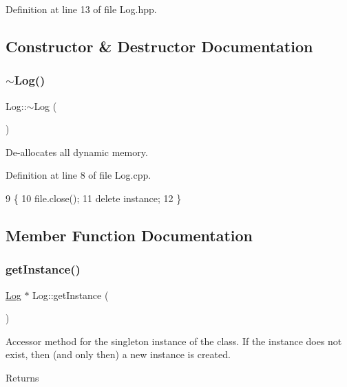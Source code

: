 Definition at line 13 of file Log.\+hpp.



\subsection{Constructor \& Destructor Documentation}
\mbox{\label{classLog_a0fbfda88fbee5027c89f6eb121059360}} 
\subsubsection{\texorpdfstring{$\sim$\+Log()}{~Log()}}
{\footnotesize\ttfamily Log\+::$\sim$\+Log (\begin{DoxyParamCaption}{ }\end{DoxyParamCaption})}

De-\/allocates all dynamic memory. 

Definition at line 8 of file Log.\+cpp.


\begin{DoxyCode}
9 \{
10   file.close();
11   \textcolor{keyword}{delete} instance;
12 \}
\end{DoxyCode}


\subsection{Member Function Documentation}
\mbox{\label{classLog_a987f3ff401eea783d0e80daaea1d7aca}} 
\subsubsection{\texorpdfstring{get\+Instance()}{getInstance()}}
{\footnotesize\ttfamily \mbox{\hyperlink{classLog}{Log}} $\ast$ Log\+::get\+Instance (\begin{DoxyParamCaption}{ }\end{DoxyParamCaption})\hspace{0.3cm}{\ttfamily [static]}}

Accessor method for the singleton instance of the class. If the instance does not exist, then (and only then) a new instance is created. \begin{DoxyReturn}{Returns}

\end{DoxyReturn}


